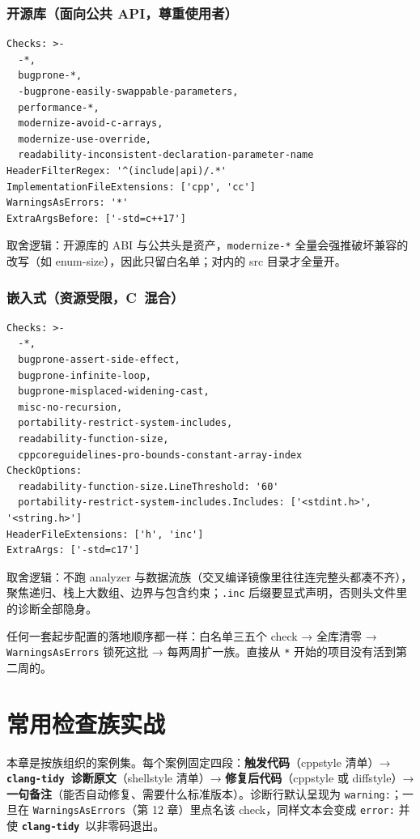 \documentclass[12pt,a4paper,fontset=fandol]{ctexbook}
\newcommand{\Lib}[1]{\textbf{\texttt{#1}}}
\newcommand{\Lang}[1]{\textsf{#1}}
\newcommand{\CL}{\Lang{C}}
\newcommand{\Tidy}{\Lib{clang-tidy}}
\begin{document}
\subsection{开源库（面向公共 API，尊重使用者）}\label{sec:ch12-s6c}
\begin{lstlisting}[style=yamlstyle,caption={开源库集：只管 src，不管对外头文件的风格},label={lst:ch12-cfg3}]
Checks: >-
  -*,
  bugprone-*,
  -bugprone-easily-swappable-parameters,
  performance-*,
  modernize-avoid-c-arrays,
  modernize-use-override,
  readability-inconsistent-declaration-parameter-name
HeaderFilterRegex: '^(include|api)/.*'
ImplementationFileExtensions: ['cpp', 'cc']
WarningsAsErrors: '*'
ExtraArgsBefore: ['-std=c++17']
\end{lstlisting}
取舍逻辑：开源库的 ABI 与公共头是资产，\texttt{modernize-*} 全量会强推破坏兼容的改写（如 enum-size），因此只留白名单；对内的 src 目录才全量开。
\subsection{嵌入式（资源受限，\CL\ 混合）}\label{sec:ch12-s6d}
\begin{lstlisting}[style=yamlstyle,caption={嵌入式集：小 CPU 预算，突出 ISR/并发/边界},label={lst:ch12-cfg4}]
Checks: >-
  -*,
  bugprone-assert-side-effect,
  bugprone-infinite-loop,
  bugprone-misplaced-widening-cast,
  misc-no-recursion,
  portability-restrict-system-includes,
  readability-function-size,
  cppcoreguidelines-pro-bounds-constant-array-index
CheckOptions:
  readability-function-size.LineThreshold: '60'
  portability-restrict-system-includes.Includes: ['<stdint.h>', '<string.h>']
HeaderFileExtensions: ['h', 'inc']
ExtraArgs: ['-std=c17']
\end{lstlisting}
取舍逻辑：不跑 analyzer 与数据流族（交叉编译镜像里往往连完整头都凑不齐），聚焦递归、栈上大数组、边界与包含约束；\texttt{.inc} 后缀要显式声明，否则头文件里的诊断全部隐身。
\begin{bestpractice}[title={先小集合跑通，再扩}]
任何一套起步配置的落地顺序都一样：白名单三五个 check → 全库清零 → \texttt{WarningsAsErrors} 锁死这批 → 每两周扩一族。直接从 \texttt{*} 开始的项目没有活到第二周的。
\end{bestpractice}

\chapter{常用检查族实战}\label{ch:tidy-checks}
本章是按族组织的案例集。每个案例固定四段：\textbf{触发代码}（cppstyle 清单）→ \textbf{\Tidy\ 诊断原文}（shellstyle 清单）→ \textbf{修复后代码}（cppstyle 或 diffstyle）→ \textbf{一句备注}（能否自动修复、需要什么标准版本）。诊断行默认呈现为 \texttt{warning:}；一旦在 \texttt{WarningsAsErrors}（第 12 章）里点名该 check，同样文本会变成 \texttt{error:} 并使 \Tidy\ 以非零码退出。
\end{document}
